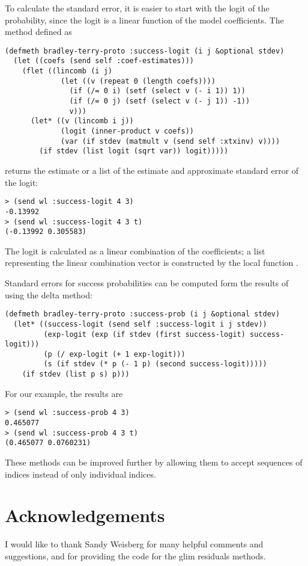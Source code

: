 To calculate the standard error, it is easier to start with the logit
of the probability, since the logit is a linear function of the model
coefficients. The method defined as
\begin{verbatim}
(defmeth bradley-terry-proto :success-logit (i j &optional stdev)
  (let ((coefs (send self :coef-estimates)))
    (flet ((lincomb (i j)
             (let ((v (repeat 0 (length coefs))))
               (if (/= 0 i) (setf (select v (- i 1)) 1))
               (if (/= 0 j) (setf (select v (- j 1)) -1))
               v)))
      (let* ((v (lincomb i j))
             (logit (inner-product v coefs))
             (var (if stdev (matmult v (send self :xtxinv) v))))
        (if stdev (list logit (sqrt var)) logit)))))
\end{verbatim}
returns the estimate or a list of the estimate and approximate
standard error of the logit:
\begin{verbatim}
> (send wl :success-logit 4 3)
-0.13992
> (send wl :success-logit 4 3 t)
(-0.13992 0.305583)
\end{verbatim}
The logit is calculated as a linear combination of the coefficients; a
list representing the linear combination vector is constructed by the
local function .

Standard errors for success probabilities can be computed form the
results of  using the delta method:
\begin{verbatim}
(defmeth bradley-terry-proto :success-prob (i j &optional stdev)
  (let* ((success-logit (send self :success-logit i j stdev))
         (exp-logit (exp (if stdev (first success-logit) success-logit)))
         (p (/ exp-logit (+ 1 exp-logit)))
         (s (if stdev (* p (- 1 p) (second success-logit)))))
    (if stdev (list p s) p)))
\end{verbatim}
For our example, the results are
\begin{verbatim}
> (send wl :success-prob 4 3)
0.465077
> (send wl :success-prob 4 3 t)
(0.465077 0.0760231)
\end{verbatim}

These methods can be improved further by allowing them to accept
sequences of indices instead of only individual indices.

\section*{Acknowledgements}
I would like to thank Sandy Weisberg for many helpful comments and
suggestions, and for providing the code for the glim residuals
methods.

